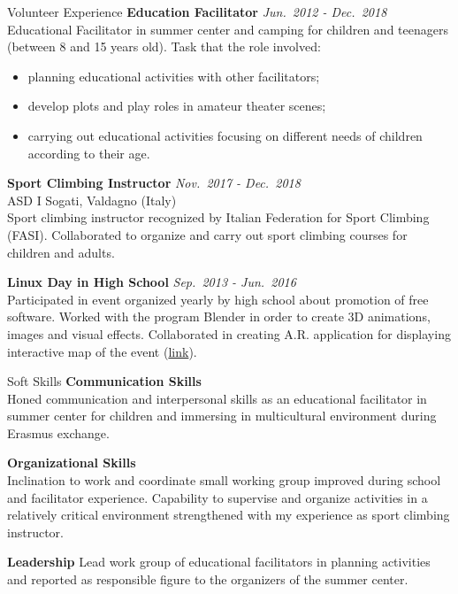 \documentclass{resume} %
\begin{document}
\begin{rSection}{Volunteer Experience}
    {\bf Education Facilitator}
    \hfill{\em Jun.~2012 - Dec.~2018}
    \\ Educational Facilitator in summer center and camping for children and teenagers (between 8 and 15 years old). Task that the role involved:
    \begin{itemize}
        \item planning educational activities with other facilitators;
        \item develop plots and play roles in amateur theater scenes;
        \item carrying out educational activities focusing on different needs of children according to their age.
    \end{itemize}

    {\bf Sport Climbing Instructor}
    \hfill {\em Nov.~2017 - Dec.~2018}\\
    ASD I Sogati, Valdagno (Italy) \\
    Sport climbing instructor recognized by Italian Federation for Sport Climbing (FASI). Collaborated to organize and carry out sport climbing courses for children and adults.

    {\bf Linux Day in High School}
    \hfill {\em Sep.~2013 - Jun.~2016}\\
    Participated in event organized yearly by high school about promotion of free software. Worked with the program Blender in order to create 3D animations, images and visual effects. Collaborated in creating A.R. application for displaying interactive map of the event (\href{https://play.google.com/store/apps/details?id=it.itismarzotto.armaps&hl=it}{link}).

\end{rSection}

\begin{rSection}{Soft Skills}
    {\bf Communication Skills}\\
    Honed communication and interpersonal skills as an educational facilitator in summer center for children and immersing in multicultural environment during Erasmus exchange. 

    {\bf Organizational Skills}\\
    Inclination to work and coordinate small working group improved during school and facilitator experience.
    Capability to supervise and organize activities in a relatively critical environment strengthened with my experience as sport climbing instructor.

    {\bf Leadership}
    Lead work group of educational facilitators in planning activities and reported as responsible figure to the organizers of the summer center.
\end{rSection}
\end{document}
